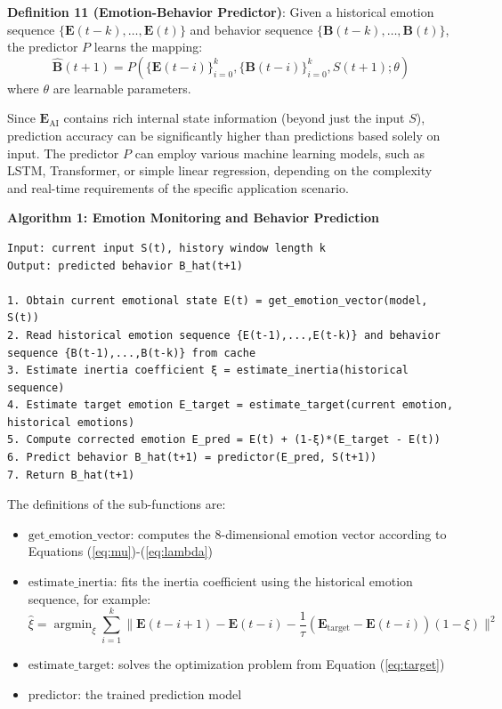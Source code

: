 \documentclass[12pt,a4paper]{article}
\theoremstyle{plain}
\newcommand{\ve}[1]{\bm{#1}}                    %
\newcommand{\Evec}{\ve{E}}                        %
\newcommand{\Bvec}{\ve{B}}                        %
\DeclareMathOperator*{\argmin}{argmin}
\begin{document}
\textbf{Definition 11 (Emotion-Behavior Predictor)}: Given a historical emotion sequence $\{\Evec(t-k), \dots, \Evec(t)\}$ and behavior sequence $\{\Bvec(t-k), \dots, \Bvec(t)\}$, the predictor $P$ learns the mapping:
\begin{equation}
\hat{\Bvec}(t+1) = P\left( \{\Evec(t-i)\}_{i=0}^{k}, \{\Bvec(t-i)\}_{i=0}^{k}, S(t+1); \theta \right)
\label{eq:predictor}
\end{equation}
where $\theta$ are learnable parameters.

Since $\Evec_{\text{AI}}$ contains rich internal state information (beyond just the input $S$), prediction accuracy can be significantly higher than predictions based solely on input. The predictor $P$ can employ various machine learning models, such as LSTM, Transformer, or simple linear regression, depending on the complexity and real-time requirements of the specific application scenario.

\textbf{Algorithm 1: Emotion Monitoring and Behavior Prediction}
\begin{verbatim}
Input: current input S(t), history window length k
Output: predicted behavior B_hat(t+1)

1. Obtain current emotional state E(t) = get_emotion_vector(model, S(t))
2. Read historical emotion sequence {E(t-1),...,E(t-k)} and behavior sequence {B(t-1),...,B(t-k)} from cache
3. Estimate inertia coefficient ξ = estimate_inertia(historical sequence)
4. Estimate target emotion E_target = estimate_target(current emotion, historical emotions)
5. Compute corrected emotion E_pred = E(t) + (1-ξ)*(E_target - E(t))
6. Predict behavior B_hat(t+1) = predictor(E_pred, S(t+1))
7. Return B_hat(t+1)
\end{verbatim}

The definitions of the sub-functions are:
\begin{itemize}
    \item $\text{get\_emotion\_vector}$: computes the 8-dimensional emotion vector according to Equations (\ref{eq:mu})-(\ref{eq:lambda})
    \item $\text{estimate\_inertia}$: fits the inertia coefficient using the historical emotion sequence, for example:
    \begin{equation}
    \hat{\xi} = \argmin_{\xi} \sum_{i=1}^{k} \| \Evec(t-i+1) - \Evec(t-i) - \frac{1}{\tau}(\Evec_{\text{target}} - \Evec(t-i))(1-\xi) \|^2
    \end{equation}
    \item $\text{estimate\_target}$: solves the optimization problem from Equation (\ref{eq:target})
    \item $\text{predictor}$: the trained prediction model
\end{itemize}
\end{document}

